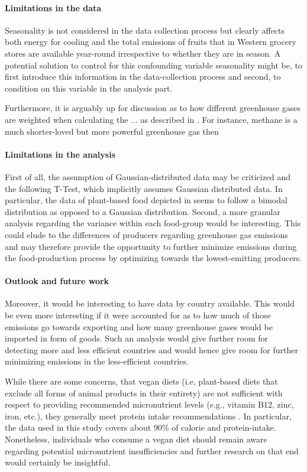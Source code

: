 \documentclass{article}
\begin{document}
\paragraph*{Limitations in the data}
Seasonality is not considered in the data collection process but clearly affects both energy for cooling and the total emissions of fruits that in Western grocery stores are available year-round irrespective to whether they are in season. A potential solution to control for this confounding variable seasonality might be, to first introduce this information in the data-collection process and second, to condition on this variable in the analysis part.

Furthermore, it is arguably up for discussion as to how different greenhouse gases are weighted  when calculating the ... as described in  . For instance, methane is a much shorter-loved but more powerful greenhouse gas then 




\paragraph*{Limitations in the analysis}
First of all, the assumption of Gaussian-distributed data may be criticized and the following T-Test, which implicitly assumes Gaussian distributed data.
In particular, the data of plant-based food depicted in  seems to follow a bimodal distribution as opposed to a Gaussian distribution.
Second, a more granular analysis regarding the variance within each food-group would be interesting. This could elude to the differences of producers regarding greenhouse gas emissions and may therefore provide the opportunity to further minimize emissions during the food-production process by optimizing towards the lowest-emitting producers. 

\paragraph*{Outlook and future work}

Moreover, it would be interesting to have data by country available. This would be even more interesting if it were accounted for as to how much of those emissions go towards exporting and how many greenhouse gases would be imported in form of goods. Such an analysis would give further room for detecting more and less efficient countries and would hence give room for further minimizing emissions in the less-efficient countries.

While there are some concerns, that vegan diets (i.e, plant-based diets that exclude all forms of animal products in their entirety) are not sufficient with respect to providing recommended micronutrient levels (e.g., vitamin B12, zinc, iron, etc.), they generally meet protein intake recommendations \cite{WHO2021}. In particular, the data used in this study covers about 90\% of calorie and protein-intake. Nonetheless, individuals who consume a vegan diet should remain aware regarding potential micronutrient insufficiencies and further research on that end would certainly be insightful.

  
{\small


}
\end{document}
